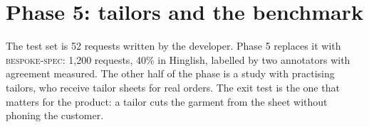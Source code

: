 \section{Phase 5: tailors and the benchmark}
The test set is 52 requests written by the developer. Phase 5 replaces it with \textsc{bespoke-spec}: 1,200 requests, 40\% in Hinglish, labelled by two annotators with agreement measured. The other half of the phase is a study with practising tailors, who receive tailor sheets for real orders. The exit test is the one that matters for the product: a tailor cuts the garment from the sheet without phoning the customer.
